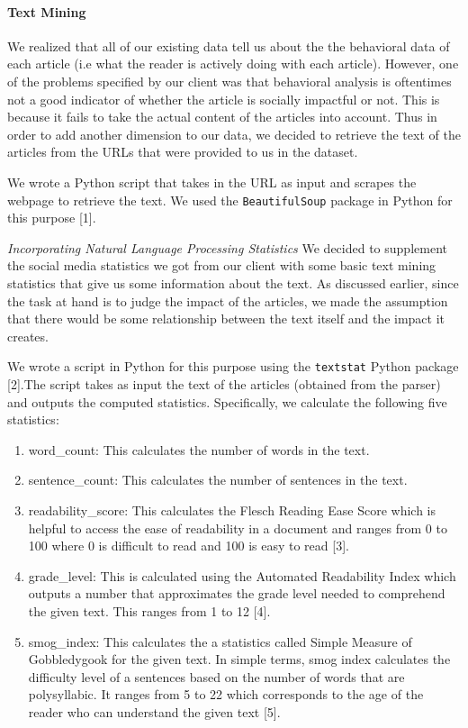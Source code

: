 \documentclass[10pt,letterpaper]{article}
\providecommand{\tightlist}{%
  \setlength{\itemsep}{0pt}\setlength{\parskip}{0pt}}
\begin{document}
\hypertarget{text-mining}{%
\paragraph{Text Mining}\label{text-mining}}

We realized that all of our existing data tell us about the the
behavioral data of each article (i.e what the reader is actively doing
with each article). However, one of the problems specified by our client
was that behavioral analysis is oftentimes not a good indicator of
whether the article is socially impactful or not. This is because it
fails to take the actual content of the articles into account. Thus in
order to add another dimension to our data, we decided to retrieve the
text of the articles from the URLs that were provided to us in the
dataset.

We wrote a Python script that takes in the URL as input and scrapes the
webpage to retrieve the text. We used the \texttt{BeautifulSoup} package
in Python for this purpose {[}1{]}.

\emph{Incorporating Natural Language Processing Statistics} We decided
to supplement the social media statistics we got from our client with
some basic text mining statistics that give us some information about
the text. As discussed earlier, since the task at hand is to judge the
impact of the articles, we made the assumption that there would be some
relationship between the text itself and the impact it creates.

We wrote a script in Python for this purpose using the \texttt{textstat}
Python package {[}2{]}.The script takes as input the text of the
articles (obtained from the parser) and outputs the computed statistics.
Specifically, we calculate the following five statistics:

\begin{enumerate}
\def\labelenumi{\arabic{enumi}.}
\tightlist
\item
  word\_count: This calculates the number of words in the text.
\item
  sentence\_count: This calculates the number of sentences in the text.
\item
  readability\_score: This calculates the Flesch Reading Ease Score
  which is helpful to access the ease of readability in a document and
  ranges from 0 to 100 where 0 is difficult to read and 100 is easy to
  read {[}3{]}.
\item
  grade\_level: This is calculated using the Automated Readability Index
  which outputs a number that approximates the grade level needed to
  comprehend the given text. This ranges from 1 to 12 {[}4{]}.
\item
  smog\_index: This calculates the a statistics called Simple Measure of
  Gobbledygook for the given text. In simple terms, smog index
  calculates the difficulty level of a sentences based on the number of
  words that are polysyllabic. It ranges from 5 to 22 which corresponds
  to the age of the reader who can understand the given text {[}5{]}.
\end{enumerate}
\end{document}
